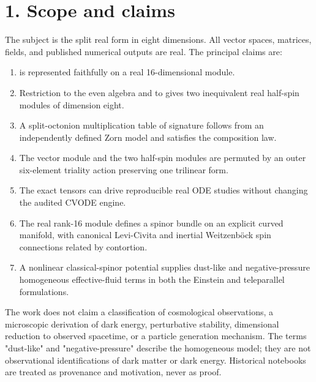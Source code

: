 \documentclass[11pt]{article}
\begin{document}
\section{1. Scope and claims}

The subject is the split real form in eight dimensions. All vector spaces, matrices, fields, and published numerical outputs are real. The principal claims are:

\begin{enumerate}
\item \texttt{} is represented faithfully on a real 16-dimensional module.
\item Restriction to the even algebra and to \texttt{} gives two inequivalent
real half-spin modules of dimension eight.

\item A split-octonion multiplication table of signature \texttt{} follows from an
independently defined Zorn model and satisfies the composition law.

\item The vector module and the two half-spin modules are permuted by an outer
six-element triality action preserving one trilinear form.

\item The exact tensors can drive reproducible real ODE studies without changing
the audited CVODE engine.

\item The real rank-16 module defines a spinor bundle on an explicit curved
\texttt{} manifold, with canonical Levi-Civita and inertial Weitzenböck spin connections related by contortion.

\item A nonlinear classical-spinor potential supplies dust-like and
negative-pressure homogeneous effective-fluid terms in both the Einstein and teleparallel formulations.

\end{enumerate}

The work does not claim a classification of cosmological observations, a microscopic derivation of dark energy, perturbative stability, dimensional reduction to observed \texttt{} spacetime, or a particle generation mechanism. The terms "dust-like" and "negative-pressure" describe the homogeneous model; they are not observational identifications of dark matter or dark energy. Historical notebooks are treated as provenance and motivation, never as proof.
\end{document}
